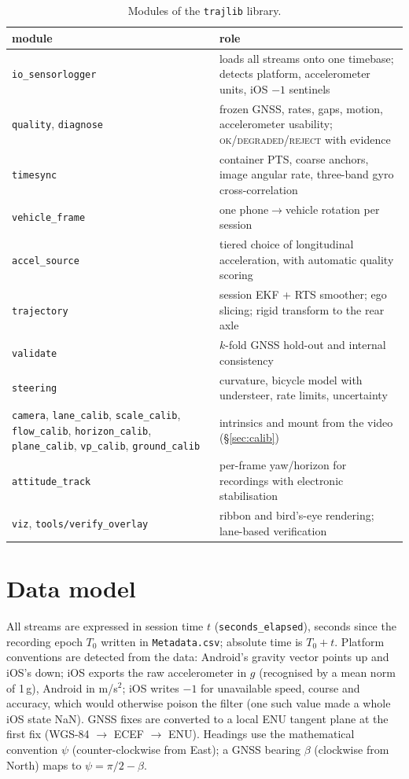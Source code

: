 \documentclass[10pt,a4paper]{article}
\begin{document}
\begin{table}[H]
\centering\small
\begin{tabularx}{\textwidth}{@{}>{\raggedright\arraybackslash}p{4.6cm}L@{}}
\toprule
module & role \\
\midrule
\texttt{io\_sensorlogger} & loads all streams onto one timebase; detects platform, accelerometer units, iOS $-1$ sentinels \\
\texttt{quality}, \texttt{diagnose} & frozen GNSS, rates, gaps, motion, accelerometer usability; \textsc{ok}/\textsc{degraded}/\textsc{reject} with evidence \\
\texttt{timesync} & container PTS, coarse anchors, image angular rate, three-band gyro cross-correlation \\
\texttt{vehicle\_frame} & one phone$\to$vehicle rotation per session \\
\texttt{accel\_source} & tiered choice of longitudinal acceleration, with automatic quality scoring \\
\texttt{trajectory} & session EKF + RTS smoother; ego slicing; rigid transform to the rear axle \\
\texttt{validate} & $k$-fold GNSS hold-out and internal consistency \\
\texttt{steering} & curvature, bicycle model with understeer, rate limits, uncertainty \\
\texttt{camera}, \texttt{lane\_calib}, \texttt{scale\_calib}, \texttt{flow\_calib}, \texttt{horizon\_calib}, \texttt{plane\_calib}, \texttt{vp\_calib}, \texttt{ground\_calib} & intrinsics and mount from the video (\S\ref{sec:calib}) \\
\texttt{attitude\_track} & per-frame yaw/horizon for recordings with electronic stabilisation \\
\texttt{viz}, \texttt{tools/verify\_overlay} & ribbon and bird's-eye rendering; lane-based verification \\
\bottomrule
\end{tabularx}
\caption{Modules of the \texttt{trajlib} library.}
\end{table}

\section{Data model}

All streams are expressed in session time $t$ (\texttt{seconds\_elapsed}), seconds since the recording
epoch $T_0$ written in \texttt{Metadata.csv}; absolute time is $T_0 + t$. Platform conventions are detected
from the data: Android's gravity vector points up and iOS's down; iOS exports the raw accelerometer in $g$
(recognised by a mean norm of 1\,g), Android in m/s$^2$; iOS writes $-1$ for unavailable speed, course and
accuracy, which would otherwise poison the filter (one such value made a whole iOS state NaN).
GNSS fixes are converted to a local ENU tangent plane at the first fix (WGS-84 $\to$ ECEF $\to$ ENU).
Headings use the mathematical convention $\psi$ (counter-clockwise from East); a GNSS bearing $\beta$
(clockwise from North) maps to $\psi = \pi/2 - \beta$.
\end{document}
